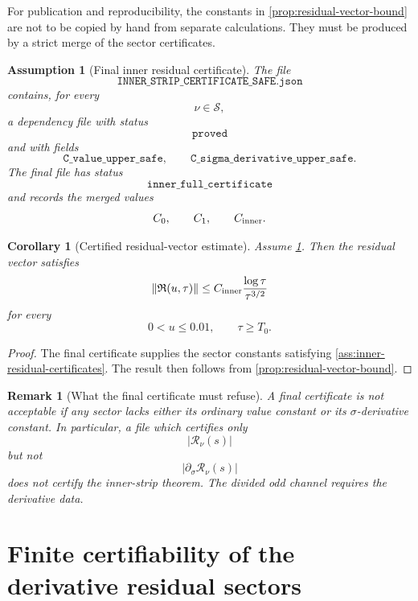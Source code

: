 \documentclass[11pt]{article}
\newtheorem{corollary}[theorem]{Corollary}
\newtheorem{remark}[theorem]{Remark}
\newtheorem{assumption}[theorem]{Assumption}
\newcommand{\Rvec}{\mathfrak R}
\newcommand{\Cinner}{C_{\rm inner}}
\newcommand{\Czero}{C_0}
\newcommand{\Cone}{C_1}
\begin{document}
For publication and reproducibility, the constants in
\cref{prop:residual-vector-bound} are not to be copied by hand from separate
calculations.  They must be produced by a strict merge of the sector
certificates.

\begin{assumption}[Final inner residual certificate]
\label{ass:final-inner-residual-certificate}
The file
\[
        \texttt{INNER\_STRIP\_CERTIFICATE\_SAFE.json}
\]
contains, for every
\[
        \nu\in\mathcal S,
\]
a dependency file with status
\[
        \texttt{proved}
\]
and with fields
\[
        \texttt{C\_value\_upper\_safe},
        \qquad
        \texttt{C\_sigma\_derivative\_upper\_safe}.
\]
The final file has status
\[
        \texttt{inner\_full\_certificate}
\]
and records the merged values
\[
        \Czero,
        \qquad
        \Cone,
        \qquad
        \Cinner.
\]
\end{assumption}

\begin{corollary}[Certified residual-vector estimate]
\label{cor:certified-residual-vector-estimate}
Assume \cref{ass:final-inner-residual-certificate}.  Then the residual vector
satisfies
\[
        \|\Rvec(u,\tau)\|
        \le
        \Cinner
        \frac{\log\tau}{\tau^{3/2}}
\]
for every
\[
        0<u\le0.01,
        \qquad
        \tau\ge T_0.
\]
\end{corollary}

\begin{proof}
The final certificate supplies the sector constants satisfying
\cref{ass:inner-residual-certificates}.  The result then follows from
\cref{prop:residual-vector-bound}.
\end{proof}

\begin{remark}[What the final certificate must refuse]
A final certificate is not acceptable if any sector lacks either its ordinary
value constant or its \(\sigma\)-derivative constant.  In particular, a file
which certifies only
\[
        |\mathcal R_\nu(s)|
\]
but not
\[
        |\partial_\sigma\mathcal R_\nu(s)|
\]
does not certify the inner-strip theorem.  The divided odd channel requires the
derivative data.
\end{remark}


\section{Finite certifiability of the derivative residual sectors}
\label{sec:sector-certifiability}
\end{document}
